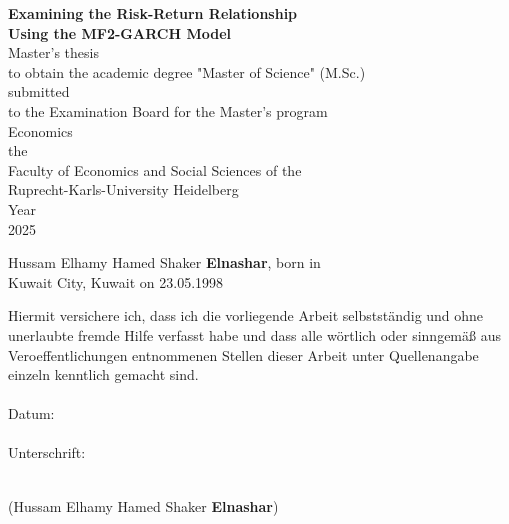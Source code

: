 \documentclass[12pt]{article}
\begin{document}
\renewcommand*\contentsname{Table of Contents}

\thispagestyle{empty}
\hspace{0pt}
\begin{center}
\vfill
\textbf{Examining the Risk-Return Relationship \\Using the MF2-GARCH Model}\\
\vspace{25mm}
Master's thesis\\
to obtain the academic degree "Master of Science" (M.Sc.)\\
\vspace{10mm}
submitted\\
to the Examination Board for the Master's program\\
\vspace{10mm}
Economics\\
\vspace{10mm}
the\\
Faculty of Economics and Social Sciences of the\\
Ruprecht-Karls-University Heidelberg\\
\vspace{10mm}
Year\\
2025
\vspace{10mm}
\end{center}
\vfill
Hussam Elhamy Hamed Shaker \textbf{Elnashar}, born in\\
Kuwait City, Kuwait on 23.05.1998
\hspace{0pt}

\newpage
\thispagestyle{empty}
\noindent Hiermit versichere ich, dass ich die vorliegende Arbeit selbstständig und ohne unerlaubte fremde Hilfe verfasst habe und dass alle wörtlich oder sinngemäß aus Veroeffentlichungen entnommenen Stellen dieser Arbeit unter Quellenangabe einzeln kenntlich gemacht sind.\\\\
Datum:\\\\
Unterschrift:\\\\
\begin{center}
(Hussam Elhamy Hamed Shaker \textbf{Elnashar})
\end{center}

\newpage
\thispagestyle{empty}
\tableofcontents
\thispagestyle{empty}

\newpage
{}
\setcounter{page}{1}
\end{document}
